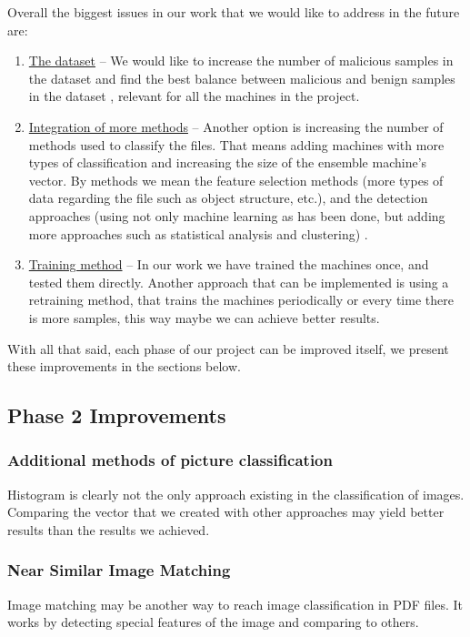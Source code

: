 \documentclass{article}
\begin{document}
\noindent Overall the biggest issues in our work that we would like to address in the future are:
\begin{enumerate}
	\item\underline{The dataset} – We would like to increase the number of malicious samples in the dataset and find the best balance between malicious and benign samples in the dataset \cite{BGU2014malicious}, relevant for all the machines in the project.
	\item\underline{Integration of more methods} – Another option is increasing the number of methods used to classify the files. That means adding machines with more types of classification and increasing the size of the ensemble machine's vector. By methods we mean the feature selection methods (more types of data regarding the file such as object structure, etc.), and the detection approaches (using not only machine learning as has been done, but adding more approaches such as statistical analysis and clustering) \cite{BGU2014survey} \cite{Baldoni2018survey}.
	\item\underline{Training method} – In our work we have trained the machines once, and tested them directly. Another approach that can be implemented is using a retraining method, that trains the machines periodically or every time there is more samples, this way maybe we can achieve better results.
\end{enumerate}

\noindent With all that said, each phase of our project can be improved itself, we present these improvements in the sections below.

\subsection{Phase 2 Improvements}
\subsubsection{Additional methods of picture classification}
\indent Histogram is clearly not the only approach existing in the classification of images. Comparing the vector that we created with other approaches may yield better results than the results we achieved.

\subsubsection{Near Similar Image Matching}
\indent Image matching may be another way to reach image classification in PDF files. It works by detecting special features of the image and comparing to others.
\end{document}
